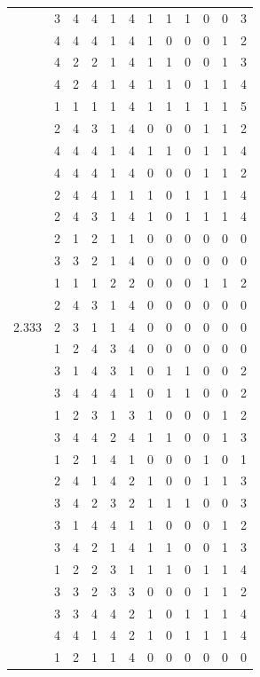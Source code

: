 \documentclass[]{msu-thesis}
\theoremstyle{definition}
\theoremstyle{definition}
\theoremstyle{definition}
\theoremstyle{remark}
\begin{document}
\begin{table}
{\begin{tabular}[t]{rrrrrrrrrrrr}
 & 3 & 4 & 4 & 1 & 4 & 1 & 1 & 1 & 0 & 0 & 3\\
 & 4 & 4 & 4 & 1 & 4 & 1 & 0 & 0 & 0 & 1 & 2\\
 & 4 & 2 & 2 & 1 & 4 & 1 & 1 & 0 & 0 & 1 & 3\\
 & 4 & 2 & 4 & 1 & 4 & 1 & 1 & 0 & 1 & 1 & 4\\
 & 1 & 1 & 1 & 1 & 4 & 1 & 1 & 1 & 1 & 1 & 5\\
 & 2 & 4 & 3 & 1 & 4 & 0 & 0 & 0 & 1 & 1 & 2\\
 & 4 & 4 & 4 & 1 & 4 & 1 & 1 & 0 & 1 & 1 & 4\\
 & 4 & 4 & 4 & 1 & 4 & 0 & 0 & 0 & 1 & 1 & 2\\
 & 2 & 4 & 4 & 1 & 1 & 1 & 0 & 1 & 1 & 1 & 4\\
 & 2 & 4 & 3 & 1 & 4 & 1 & 0 & 1 & 1 & 1 & 4\\
 & 2 & 1 & 2 & 1 & 1 & 0 & 0 & 0 & 0 & 0 & 0\\
 & 3 & 3 & 2 & 1 & 4 & 0 & 0 & 0 & 0 & 0 & 0\\
 & 1 & 1 & 1 & 2 & 2 & 0 & 0 & 0 & 1 & 1 & 2\\
 & 2 & 4 & 3 & 1 & 4 & 0 & 0 & 0 & 0 & 0 & 0\\
2.333 & 2 & 3 & 1 & 1 & 4 & 0 & 0 & 0 & 0 & 0 & 0\\
 & 1 & 2 & 4 & 3 & 4 & 0 & 0 & 0 & 0 & 0 & 0\\
 & 3 & 1 & 4 & 3 & 1 & 0 & 1 & 1 & 0 & 0 & 2\\
 & 3 & 4 & 4 & 4 & 1 & 0 & 1 & 1 & 0 & 0 & 2\\
 & 1 & 2 & 3 & 1 & 3 & 1 & 0 & 0 & 0 & 1 & 2\\
 & 3 & 4 & 4 & 2 & 4 & 1 & 1 & 0 & 0 & 1 & 3\\
 & 1 & 2 & 1 & 4 & 1 & 0 & 0 & 0 & 1 & 0 & 1\\
 & 2 & 4 & 1 & 4 & 2 & 1 & 0 & 0 & 1 & 1 & 3\\
 & 3 & 4 & 2 & 3 & 2 & 1 & 1 & 1 & 0 & 0 & 3\\
 & 3 & 1 & 4 & 4 & 1 & 1 & 0 & 0 & 0 & 1 & 2\\
 & 3 & 4 & 2 & 1 & 4 & 1 & 1 & 0 & 0 & 1 & 3\\
 & 1 & 2 & 2 & 3 & 1 & 1 & 1 & 0 & 1 & 1 & 4\\
 & 3 & 3 & 2 & 3 & 3 & 0 & 0 & 0 & 1 & 1 & 2\\
 & 3 & 3 & 4 & 4 & 2 & 1 & 0 & 1 & 1 & 1 & 4\\
 & 4 & 4 & 1 & 4 & 2 & 1 & 0 & 1 & 1 & 1 & 4\\
 & 1 & 2 & 1 & 1 & 4 & 0 & 0 & 0 & 0 & 0 & 0\\

\end{tabular}}
\end{table}
\end{document}
